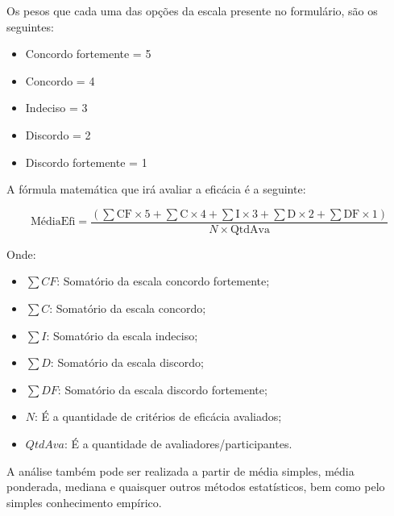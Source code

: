 Os pesos que cada uma das opções da escala presente no formulário, são os seguintes:
\begin{itemize}
    \item Concordo fortemente = 5
    \item Concordo = 4
    \item Indeciso = 3
    \item Discordo = 2
    \item Discordo fortemente = 1
\end{itemize}

A fórmula matemática que irá avaliar a eficácia é a seguinte:

\begin{equation}
\text{MédiaEfi} = \frac{(\sum \text{CF} \times 5 + \sum \text{C} \times 4 + \sum \text{I} \times 3 + \sum \text{D} \times 2 + \sum \text{DF} \times 1)}{N \times \text{QtdAva}}
\end{equation}

Onde: 
\begin{itemize}
    \item $\sum CF$: Somatório da escala concordo fortemente;
    \item $\sum C$: Somatório da escala concordo;
    \item $\sum I$: Somatório da escala indeciso;
    \item $\sum D$: Somatório da escala discordo;
    \item $\sum DF$: Somatório da escala discordo fortemente;
    \item $N$: É a quantidade de critérios de eficácia avaliados;
    \item $QtdAva$: É a quantidade de avaliadores/participantes.
\end{itemize}

A análise também pode ser realizada a partir de média simples, média ponderada, mediana e quaisquer outros métodos estatísticos, bem como pelo simples conhecimento empírico.






